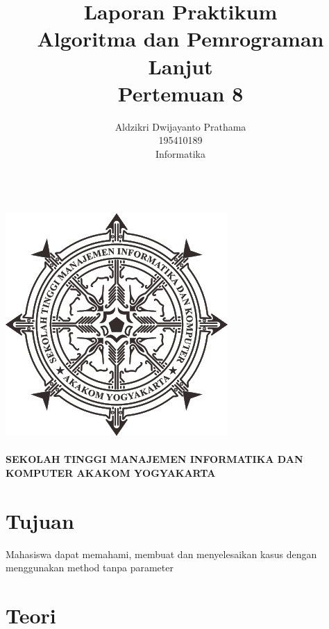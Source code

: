 \documentclass[a4paper,12pt]{article}
\begin{document}
\title{ {\Large Laporan Praktikum}\\ Algoritma dan Pemrograman Lanjut\\{\Large Pertemuan 8}}

\author{Aldzikri Dwijayanto Prathama
    \\195410189
    \\Informatika}
\makeatletter
\begin{titlepage}
    \begin{center}
        {\huge \bfseries \@title}\\[14ex]
        \includegraphics[scale=.8]{logo}\\[4ex]
        {\large \@author}\\[12ex]
        {\large \bfseries {SEKOLAH TINGGI MANAJEMEN INFORMATIKA DAN KOMPUTER
            AKAKOM YOGYAKARTA}}
    \end{center}


\end{titlepage}
\makeatother
\newpage
\tableofcontents
\newpage

\section{Tujuan}
Mahasiswa dapat memahami, membuat dan menyelesaikan kasus dengan
menggunakan method tanpa parameter

\section{Teori}
\end{document}
